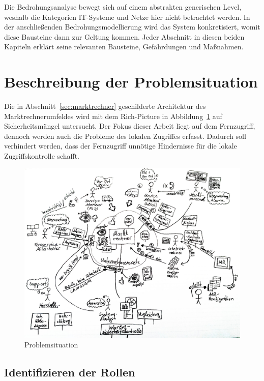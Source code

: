\documentclass[11pt,a4paper]{report}
\begin{document}
Die Bedrohungsanalyse bewegt sich auf einem abstrakten generischen Level, weshalb die Kategorien IT-Systeme und Netze hier nicht betrachtet werden. In der anschließenden Bedrohungsmodellierung wird das System konkretisiert, womit diese Bausteine dann zur Geltung kommen. Jeder Abschnitt in diesen beiden Kapiteln erklärt seine relevanten Bausteine, Gefährdungen und Maßnahmen.

\section{Beschreibung der Problemsituation} \label{sec:problem_situation}

Die in Abschnitt~\ref{sec:marktrechner} geschilderte Architektur des Marktrechnerumfeldes wird mit dem Rich-Picture in Abbildung~\ref{fig:problem_situation} auf Sicherheitsmängel untersucht. Der Fokus dieser Arbeit liegt auf dem Fernzugriff, dennoch werden auch die Probleme des lokalen Zugriffes erfasst. Dadurch soll verhindert werden, dass der Fernzugriff unnötige Hindernisse für die lokale Zugriffskontrolle schafft. 

\begin{figure}[htb]
\centering
\includegraphics[scale=0.215]{images/problemsituation.jpg}
\caption{Problemsituation}
\label{fig:problem_situation}
\end{figure}

\subsection{Identifizieren der Rollen} \label{sec:roles}
\end{document}
